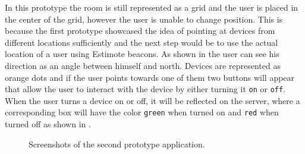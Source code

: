 In this prototype the room is still represented as a grid and the user is placed in the center of the grid, however the user is unable to change position.
This is because the first prototype showcased the idea of pointing at devices from different locations sufficiently and the next step would be to use the actual location of a user using Estimote beacons.
As shown in  the user can see his direction as an angle between himself and north.
Devices are represented as orange dots and if the user points towards one of them two buttons will appear that allow the user to interact with the device by either turning it \texttt{on} or \texttt{off}.
When the user turns a device on or off, it will be reflected on the server, 
where a corresponding box will have the color \texttt{green} when turned on and \texttt{red} when turned off as shown in .

\begin{figure}[!htb]%
    \centering
    \caption{Screenshots of the second prototype application.}
    \label{fig:prototype2-app-screenshots}
\end{figure}

